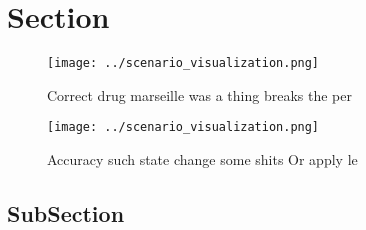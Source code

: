\documentclass[a4paper]{article}
\begin{document}
\section{Section}

\begin{figure}
\centering
\texttt{[image: ../scenario\_visualization.png]}
\caption{Correct drug marseille was a thing breaks the per
}
\end{figure}
 
\begin{figure}
\centering
\texttt{[image: ../scenario\_visualization.png]}
\caption{Accuracy such state change some shits Or apply le
}
\end{figure}
 
\subsection{SubSection}
\end{document}
